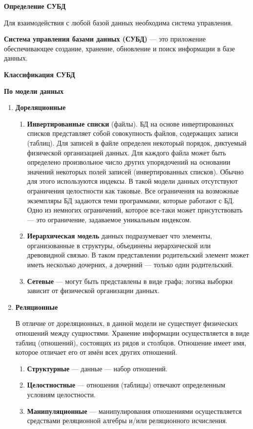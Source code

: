 \textbf{Определение СУБД}

Для взаимодействия с любой базой данных необходима система управления.

\textbf{Система управления базами данных (СУБД)} --- это приложение обеспечивающее создание, хранение, обновление и поиск информации в базе данных.

\textbf{Классификация СУБД}

\textbf{По модели данных}

\begin{enumerate}[label=\arabic*.]
	\item \textbf{Дореляционные}
	\begin{enumerate}[label=\alph*.]
		\item \textbf{Инвертированные списки} (файлы). БД на основе инвертированных списков представляет собой совокупность файлов, содержащих записи (таблиц). Для записей в файле определен некоторый порядок, диктуемый физической организацией данных. Для каждого файла может быть определено произвольное число других упорядочений на основании значений некоторых полей записей (инвертированных списков). Обычно для этого используются индексы. В такой модели данных отсутствуют ограничения целостности как таковые. Все ограничения на возможные экземпляры БД задаются теми программами, которые работают с БД. Одно из немногих ограничений, которое все-таки может присутствовать --- это ограничение, задаваемое уникальным индексом. 
		\item \textbf{Иерархическая модель} данных подразумевает что элементы, организованные в структуры, объединены иерархической или древовидной связью. В таком представлении родительский элемент может иметь несколько дочерних, а дочерний --- только один родительский.
		\item \textbf{Сетевые} --- могут быть представлены в виде графа; логика выборки зависит от физической организации данных.
	\end{enumerate}
	\item \textbf{Реляционные}
	
	В отличие от дореляционных, в данной модели не существует физических отношений между сущностями. Хранение информации осуществляется в виде таблиц (отношений), состоящих из рядов и столбцов.  Отношение имеет имя, которое отличает его от имён всех других отношений.
	\begin{enumerate}[label=\alph*.]
		\item \textbf{Структурные} --- данные --- набор отношений.
		\item \textbf{Целостностные} --- отношения (таблицы) отвечают определенным условиям целостности.
		\item \textbf{Манипуляционные} --- манипулирования отношениями осуществляется средствами реляционной алгебры и/или реляционного исчисления.
	\end{enumerate}


\end{enumerate}

